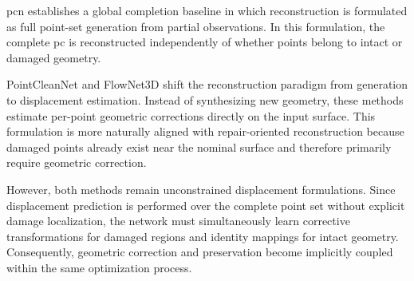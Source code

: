 \begin{table}[h]
\centering
\small
\caption{Comparison of reconstruction paradigms and architectural properties across evaluated methods.}
\label{tab:method_comparison}
\end{table}

\ac{pcn} establishes a global completion baseline in which reconstruction is formulated as full point-set generation from partial observations. In this formulation, the complete \ac{pc} is reconstructed independently of whether points belong to intact or damaged geometry.

PointCleanNet and FlowNet3D shift the reconstruction paradigm from generation to displacement estimation. Instead of synthesizing new geometry, these methods estimate per-point geometric corrections directly on the input surface. This formulation is more naturally aligned with repair-oriented reconstruction because damaged points already exist near the nominal surface and therefore primarily require geometric correction.

However, both methods remain unconstrained displacement formulations. Since displacement prediction is performed over the complete point set without explicit damage localization, the network must simultaneously learn corrective transformations for damaged regions and identity mappings for intact geometry. Consequently, geometric correction and preservation become implicitly coupled within the same optimization process.

